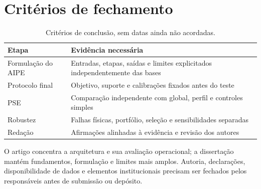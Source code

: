 \section{Critérios de fechamento}
\begin{table}[htbp]\centering\small
\caption{Critérios de conclusão, sem datas ainda não acordadas.}\label{tab:cronograma}
\begin{tabular}{@{}p{4cm}p{8.8cm}@{}}\toprule
Etapa & Evidência necessária\\\midrule
Formulação do AIPE & Entradas, etapas, saídas e limites explicitados independentemente das bases\\
Protocolo final & Objetivo, suporte e calibrações fixados antes do teste\\
PSE & Comparação independente com global, perfil e controles simples\\
Robustez & Falhas físicas, portfólio, seleção e sensibilidades separadas\\
Redação & Afirmações alinhadas à evidência e revisão dos autores\\\bottomrule
\end{tabular}\end{table}

O artigo concentra a arquitetura e sua avaliação operacional; a dissertação mantém fundamentos, formulação e limites mais amplos. Autoria, declarações, disponibilidade de dados e elementos institucionais precisam ser fechados pelos responsáveis antes de submissão ou depósito.
